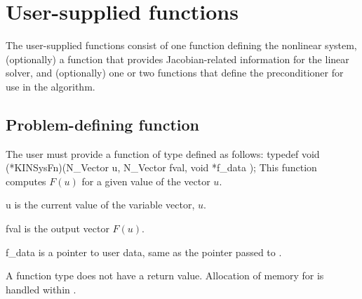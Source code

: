 \section{User-supplied functions}\label{ss:user_fct_sol}

The user-supplied functions consist of one function defining the nonlinear system, 
(optionally) a function that provides Jacobian-related information for the linear
solver, and (optionally) one or two functions that define the preconditioner for 
use in the {\spgmr} algorithm. 

\subsection{Problem-defining function} \label{ss:sysFn}

The user must provide a function of type  defined as follows:
{
  typedef void (*KINSysFn)(N\_Vector u, N\_Vector fval, void *f\_data );
}
{
  This function computes $F(u)$ for a given value of the vector $u$.
}
{
  \begin{args}[f\_data]
  \item[u]
    is the current value of the variable vector, $u$.
  \item[fval]
    is the output vector $F(u)$.
  \item[f\_data]
    is a pointer to user data, same as the pointer       
    passed to .   
  \end{args}
}
{
  A  function type does not have a return value.
}
{
Allocation of memory for  is handled within {\kinsol}.
}



